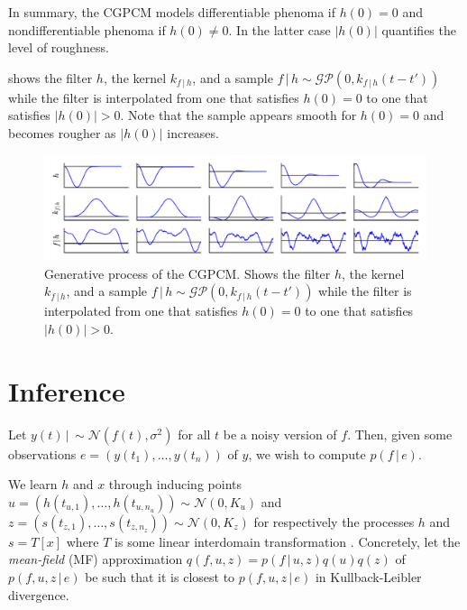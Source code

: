 \documentclass{article}
\newcommand{\argmin}{\operatorname{argmin}}
\newcommand{\KL}{\operatorname{D}_{\text{KL}}}
\newcommand{\cond}{\, | \,}               %
\begin{document}
In summary, the CGPCM models differentiable phenoma if $h(0)=0$ and nondifferentiable phenoma if $h(0)\neq 0$. In the latter case $|h(0)|$ quantifies the level of roughness.

 shows the filter $h$, the kernel $k_{f\cond h}$, and a sample $f\cond h \sim \mathcal{GP}(0,k_{f\cond h}(t-t'))$ while the filter is interpolated from one that satisfies $h(0)=0$ to one that satisfies $|h(0)|>0$. Note that the sample appears smooth for $h(0)=0$ and becomes rougher as $|h(0)|$ increases.

\begin{figure}[t]
    \centering
    \includegraphics[width=\linewidth]{resources/interpolation.pdf}
    \caption{Generative process of the CGPCM. Shows the filter $h$, the kernel $k_{f\cond h}$, and a sample $f\cond h \sim \mathcal{GP}(0,k_{f\cond h}(t-t'))$ while the filter is interpolated from one that satisfies $h(0)=0$ to one that satisfies $|h(0)|>0$.}
    \label{fig:interpolation}
\end{figure}


\section{Inference}
Let $y(t)\cond \sim \mathcal{N}(f(t),\sigma^2)$ for all $t$ be a noisy version of $f$. Then, given some observations $e=(y(t_1),\ldots,y(t_n))$ of $y$, we wish to compute $p(f\cond e)$.

We learn $h$ and $x$ through inducing points $u=(h(t_{u,1}),\ldots,h(t_{u,n_u}))\sim \mathcal{N}(0,K_u)$ and $z=(s(t_{z,1}),\ldots,s(t_{z,n_z}))\sim \mathcal{N}(0,K_z)$ for respectively the processes $h$ and $s=T[x]$ where $T$ is some linear interdomain transformation \cite{Titsias:2009:Variational_Learning,Lazaro-Gredilla:2009:Inter-Domain_Gaussian_Processes_for_Sparse,Alvarez:2010:Efficient_Multioutput_Gaussian_Processes_Through,Tobar:2015:Learning_Stationary}. Concretely, let the \textit{mean-field} (MF) approximation $q(f,u,z)=p(f\cond u, z)q(u)q(z)$ of $p(f,u,z\cond e)$ be such that it is closest to $p(f,u,z\cond e)$ in Kullback-Leibler divergence.
\end{document}
